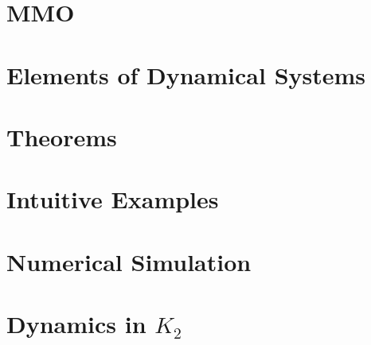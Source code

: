 \documentclass{article}
\begin{document}
\section{MMO}\label{sec: MMO Oscilaltions}


\newpage


\nocite{strogatz2007nonlinear}

\newpage
\appendix
\section{Elements of Dynamical Systems}\label{app:DynSys}

\section{Theorems}

\section{Intuitive Examples}\label{sec:definitions}%

\section{Numerical Simulation}\label{app:NumSim}

\section{Dynamics in \texorpdfstring{$K_2$}{K2}}
\end{document}
